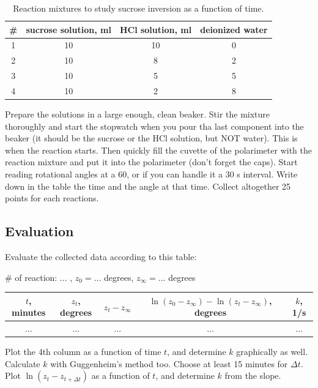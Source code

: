 \begin{table}
\caption{Reaction mixtures to study sucrose inversion as a function of time.}
\centering
\begin{tabular}{cccc}
\# & sucrose solution, ml & HCl solution, ml & deionized water \\
\hline
1 & 10 & 10 & 0 \\
2 & 10 & 8 & 2 \\
3 & 10 & 5 & 5 \\
4 & 10 & 2 & 8 \\
\end{tabular}
\label{table:reactions}
\end{table}

Prepare the solutions in a large enough, clean beaker. Stir the mixture thoroughly and start the stopwatch when you pour tha last component into the beaker (it should be the sucrose or the HCl solution, but NOT water). This is when the reaction starts. Then quickly fill the cuvette of the polarimeter with the reaction mixture and put it into the polarimeter (don't forget the caps). Start reading rotational angles at a 60, or if you can handle it a 30 s interval. Write down in the table the time and the angle at that time. Collect altogether 25 points for each reactions.

\subsection{Evaluation}
Evaluate the collected data according to this table:

\begin{center}
\# of reaction: ... , $z_0 = ...$ degrees, $z_\infty = ... $ degrees
\begin{tabular}{|c|c|c|c|c|}
\hline
$t$, minutes & $z_t$, degrees & $z_t - z_\infty$ & $\ln(z_0-z_\infty)- \ln(z_t-z_\infty)$, degrees & $k$, 1/s \\
\hline
... & ... & ... & ... & ... \\
\end{tabular}
\end{center}

Plot the 4th column as a function of time $t$, and determine $k$ graphically as well.
Calculate $k$ with Guggenheim's method too. Choose at least 15 minutes for $\Delta t$. 
Plot $\ln (z_t - z_{t+\Delta t})$ as a function of $t$, and determine $k$ from the slope.

